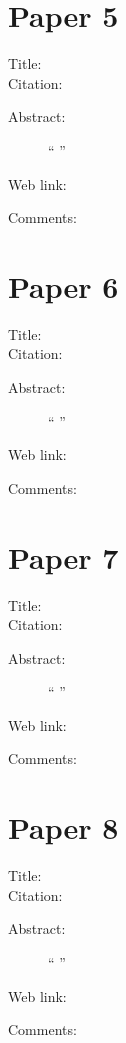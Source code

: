 \documentclass{scrartcl}
\begin{document}
	\section*{Paper 5}
	\begin{description}
		\item[Title:]
		\item[Citation:] \cite{}
		\item[Abstract:] ``
		''
		\item[Web link:] \url{}
		\item[Comments:]
	\end{description}
	
	\section*{Paper 6}
	\begin{description}
		\item[Title:]
		\item[Citation:] \cite{}
		\item[Abstract:] ``
		''
		\item[Web link:] \url{}
		\item[Comments:]
	\end{description}
	
	\section*{Paper 7}
	\begin{description}
		\item[Title:]
		\item[Citation:] \cite{}
		\item[Abstract:] ``
		''
		\item[Web link:] \url{}
		\item[Comments:]
	\end{description}
	
	\section*{Paper 8}
	\begin{description}
		\item[Title:]
		\item[Citation:] \cite{}
		\item[Abstract:] ``
		''
		\item[Web link:] \url{}
		\item[Comments:]
	\end{description}
	
\end{document}
